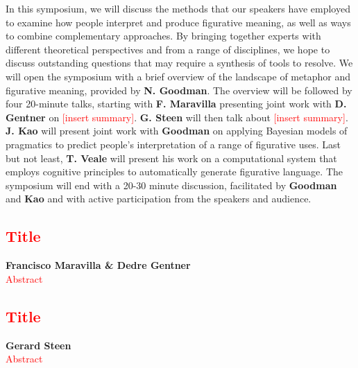\documentclass[10pt,letterpaper]{article}
\begin{document}
In this symposium, we will discuss the methods that our speakers have employed to examine how people interpret and produce figurative meaning, as well as ways to combine complementary approaches. By bringing together experts with different theoretical perspectives and from a range of disciplines, we hope to discuss outstanding questions that may require a synthesis of tools to resolve. We will open the symposium with a brief overview of the landscape of metaphor and figurative meaning, provided by \textbf{N. Goodman}. The overview will be followed by four 20-minute talks, starting with \textbf{F. Maravilla} presenting joint work with \textbf{D. Gentner} on \textcolor{red}{[insert summary]}.
\textbf{G. Steen} will then talk about \textcolor{red}{[insert summary]}. \textbf{J. Kao} will present joint work with \textbf{Goodman} on applying Bayesian models of pragmatics to predict people's interpretation of a range of figurative uses. Last but not least, \textbf{T. Veale} will present his work on a computational system that employs cognitive principles to automatically generate figurative language.
The symposium will end with a 20-30 minute discussion, facilitated by \textbf{Goodman} and \textbf{Kao} and with active participation from the speakers and audience.	


\textcolor{red}{\section{Title}}
\large \textbf{Francisco Maravilla \& Dedre Gentner}\\
\textcolor{red}{Abstract}

\textcolor{red}{\section{Title}}
\large \textbf{Gerard Steen}\\
\textcolor{red}{Abstract}
\end{document}

